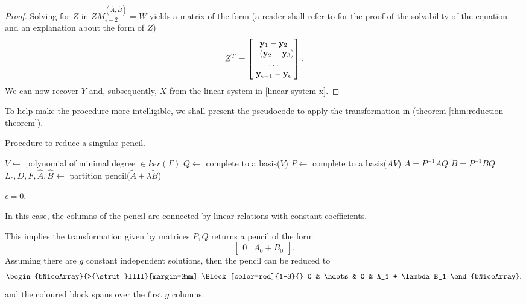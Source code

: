 \begin{cs}
\begin{proof}
        Solving for \(Z\) in \(ZM_{\epsilon-2}^{(\widehat{A}, \widehat{B})} = W\) yields a matrix of the form
        (a reader shall refer to \cite[p.34]{gantmacher} for the proof of the solvability of the equation and 
        an explanation about the form of \(Z\))
        \[
            Z^T =
            \begin{bmatrix}
                \vb{y}_{1} - \vb{y}_{2} \\
                - (\vb{y}_{2} - \vb{y}_{3}) \\
                \hdots \\
                \vb{y}_{\epsilon-1} - \vb{y}_{\epsilon}
            \end{bmatrix}.
        \]
        We can now recover \(Y\) and, subsequently, \(X\) from the linear system in \eqref{linear-system-x}.
    \end{proof}

    To help make the procedure more intelligible, we shall present the pseudocode to apply the transformation in
     (theorem \ref{thm:reduction-theorem}).

    \pagebreak
    \begin{algorithm}[!h]\label{alg:kcf-singular}
        \caption{Procedure to reduce a singular pencil.}
        $V \gets $ polynomial of minimal degree $\in ker(\Gamma)$\;
        $Q \gets $ complete to a basis($V$)\;
        $P \gets $ complete to a basis($AV$)\;
        $\tilde{A} = P^{-1}AQ$\;
        $\tilde{B} = P^{-1}BQ$\;
        $L_{\epsilon}, D, F, \widehat{A}, \widehat{B} \gets $ partition pencil($\tilde{A} + \lambda \tilde{B}$)\;
        {\;}
    \end{algorithm}
    \case \(\epsilon = 0.\)

    In this case, the columns of the pencil are connected by linear relations with constant coefficients.

    This implies the transformation given by matrices \(P, Q\) returns a pencil of the form
    \[
        \begin{bmatrix}
            0 & A_{0} + B_{0}
        \end{bmatrix}.
    \]
    Assuming there are \(g\) constant independent solutions, then the pencil can be reduced to
    \[
    \begin{bNiceArray}{>{\strut}llll}[margin=3mm]
            \Block[color=red]{1-3}{}
            0 & \hdots & 0 & A_1 + \lambda B_1
        \end{bNiceArray},
    \]
    and the coloured block spans over the first \(g\) columns.


\end{cs}
